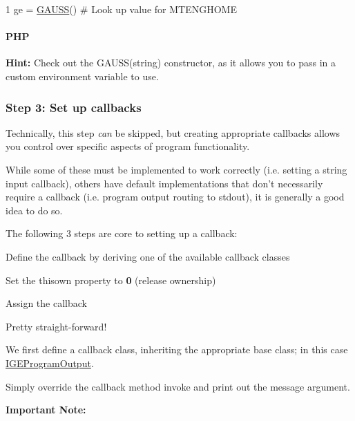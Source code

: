 \begin{DoxyCode}
1 ge = \hyperlink{class_g_a_u_s_s}{GAUSS}()  \textcolor{comment}{# Look up value for MTENGHOME}
\end{DoxyCode}
 \paragraph*{P\-H\-P}




{\bfseries Hint\-:} Check out the {\ttfamily G\-A\-U\-S\-S(string)} constructor, as it allows you to pass in a custom environment variable to use.

\subsubsection*{Step 3\-: Set up callbacks}

Technically, this step {\itshape can} be skipped, but creating appropriate callbacks allows you control over specific aspects of program functionality.

While some of these must be implemented to work correctly (i.\-e. setting a string input callback), others have default implementations that don't necessarily require a callback (i.\-e. program output routing to {\ttfamily stdout}), it is generally a good idea to do so.

The following 3 steps are core to setting up a callback\-:
\begin{DoxyEnumerate}
\item Define the callback by deriving one of the available callback classes
\item Set the {\ttfamily thisown} property to {\bfseries 0} (release ownership)
\item Assign the callback
\end{DoxyEnumerate}

Pretty straight-\/forward!

We first define a callback class, inheriting the appropriate base class; in this case \hyperlink{class_i_g_e_program_output}{I\-G\-E\-Program\-Output}.

Simply override the callback method {\ttfamily invoke} and print out the {\ttfamily message} argument.

{\bfseries Important Note\-:}

